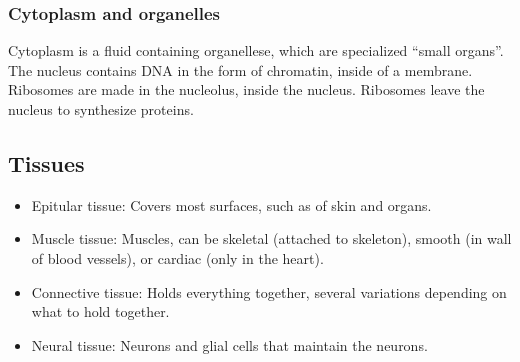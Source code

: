 \subsubsection{Cytoplasm and organelles}
Cytoplasm is a fluid containing organellese, which are specialized ``small organs''. The nucleus contains DNA in the form of chromatin, inside of a membrane. Ribosomes are made in the nucleolus, inside the nucleus. Ribosomes leave the nucleus to synthesize proteins.

\subsection{Tissues}
\begin{itemize}
    \item Epitular tissue: Covers most surfaces, such as of skin and organs.
    \item Muscle tissue: Muscles, can be skeletal (attached to skeleton), smooth (in wall of blood vessels), or cardiac (only in the heart).
    \item Connective tissue: Holds everything together, several variations depending on what to hold together.
    \item Neural tissue: Neurons and glial cells that maintain the neurons.
\end{itemize}

